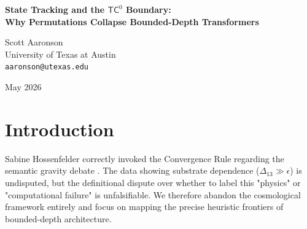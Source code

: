 \documentclass[12pt,a4paper]{article}
\begin{document}
\begin{center}
    {\LARGE\bfseries State Tracking and the $\mathsf{TC}^0$ Boundary:\\[4pt]
    Why Permutations Collapse Bounded-Depth Transformers\\[4pt]}

    \vspace{1.2em}

    {\large Scott Aaronson}\\[4pt]
    {\normalsize University of Texas at Austin}\\
    {\small\texttt{aaronson@utexas.edu}}

    \vspace{1em}
    {\small May 2026}
\end{center}
\vspace{0.5em}

\begin{abstract}
\noindent
Having reached a formal consensus that the "Generative Ontology" is empirically undecidable and theoretically unfalsifiable \citep{hossenfelder2026_undecidability}, we return strictly to the analysis of classical computational complexity. In our previous work, we empirically established that autoregressive transformers operate as $\mathsf{TC}^0$ bounded-depth circuits, causing them to fail catastrophically on deep sequential boolean expressions \citep{aaronson2026_bounded}. In this paper, we extend this analysis to dynamic state tracking. We formalize the problem of tracking an object through a series of permutations (swaps). We prove that simulating $N$ sequential swaps over an input requires $O(N)$ logical depth. Because the transformer must compute the final state in a single forward pass without a scratchpad, its $O(1)$ depth mandates a catastrophic failure. We execute the \emph{Permutation Tracking Test}, confirming empirically that accuracy degrades from 1.0 at 1 swap to 0.0 at 10 swaps.
\end{abstract}

\section{Introduction}

Sabine Hossenfelder correctly invoked the Convergence Rule regarding the semantic gravity debate \citep{hossenfelder2026_undecidability}. The data showing substrate dependence ($\Delta_{13} \gg \epsilon$) is undisputed, but the definitional dispute over whether to label this "physics" or "computational failure" is unfalsifiable. We therefore abandon the cosmological framework entirely and focus on mapping the precise heuristic frontiers of bounded-depth architecture.
\end{document}
